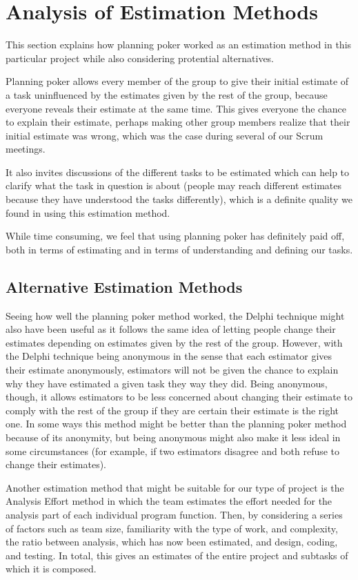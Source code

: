 \section{Analysis of Estimation Methods}
\label{sec:AnalysisEstimation}
This section explains how planning poker worked as an estimation method in this
particular project while also considering protential alternatives.

Planning poker allows every member of the group to give their initial estimate
of a task uninfluenced by the estimates given by the rest of the group, because
everyone reveals their estimate at the same time. This gives everyone the chance
to explain their estimate, perhaps making other group members realize that their
initial estimate was wrong, which was the case during several of our Scrum
meetings.

It also invites discussions of the different tasks to be estimated which can
help to clarify what the task in question is about (people may reach different
estimates because they have understood the tasks differently), which is a
definite quality we found in using this estimation method.

While time consuming, we feel that using planning poker has definitely paid off,
both in terms of estimating and in terms of understanding and defining our
tasks.

\subsection{Alternative Estimation Methods}
Seeing how well the planning poker method worked, the Delphi
technique\cite{caye} might also have been useful as it follows the same idea of
letting people change their estimates depending on estimates given by the rest
of the group. However, with the Delphi technique being anonymous in the sense
that each estimator gives their estimate anonymously, estimators will not be
given the chance to explain why they have estimated a given task they way they
did. Being anonymous, though, it allows estimators to be less concerned about
changing their estimate to comply with the rest of the group if they are certain
their estimate is the right one. In some ways this method might be better than
the planning poker method because of its anonymity, but being anonymous might
also make it less ideal in some circumstances (for example, if two estimators
disagree and both refuse to change their estimates).

Another estimation method that might be suitable for our type of project is the
Analysis Effort method\cite{caye} in which the team estimates the effort needed
for the analysis part of each individual program function. Then, by considering
a series of factors such as team size, familiarity with the type of work, and
complexity, the ratio between analysis, which has now been estimated, and
design, coding, and testing. In total, this gives an estimates of the entire
project and subtasks of which it is composed.

